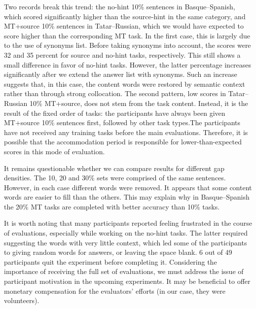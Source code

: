 \documentclass[11pt]{article}
\newcommand{\comment}[1]{}
\begin{document}
Two records break this trend: the no-hint 10\% sentences in Basque--Spanish, which scored significantly higher than the source-hint in the same category, and MT+source 10\% sentences in Tatar--Russian, which we would have expected to score higher than the corresponding MT task. In the first case, this is largely due to the use of synonyms list. Before taking synonyms into account, the scores were 32 and 35 percent for source and no-hint tasks, respectively. This still shows a small difference in favor of no-hint tasks. However, the latter percentage increases significantly after we extend the answer list with synonyms. Such an increase suggests that, in this case, the content words were restored by 
semantic context rather than through strong collocation. The second pattern, low scores in Tatar--Russian 10\% MT+source, does not stem from the task content. Instead, it is the result of the fixed order of tasks: the participants have always been given MT+source 10\% sentences first, followed by other task types.\comment{MLF: Why? Not random? \cite{oregan13} did random! Why was this changed?}The participants have not received any training tasks before the main evaluations. Therefore, it is possible that the accommodation period is responsible for lower-than-expected scores in this mode of evaluation. 

It remains questionable whether we can compare results for different gap densities. The 10, 20 and 30\% sets were comprised
of the same sentences. However, in each case different words were removed. It appears
that some content words are easier to fill than the others. This may explain why in
Basque--Spanish the 20\% MT tasks are completed with better accuracy than 10\% tasks.\comment{MLF: I think this shows that our statistics are weak, should we say something to excuse ourselves?}

It is worth noting that many participants reported feeling frustrated in
the course of evaluations, especially while working on the no-hint tasks. The latter required suggesting the words with very little context, which led some of the participants to giving random words for answers, or leaving the space blank. 6 out of 49
participants quit the experiment before completing it. Considering the importance of receiving the full set of evaluations, we must address the issue of participant motivation in the upcoming experiments. It may be beneficial to offer monetary compensation for the evaluators' efforts (in our case, they were volunteers).
\end{document}
